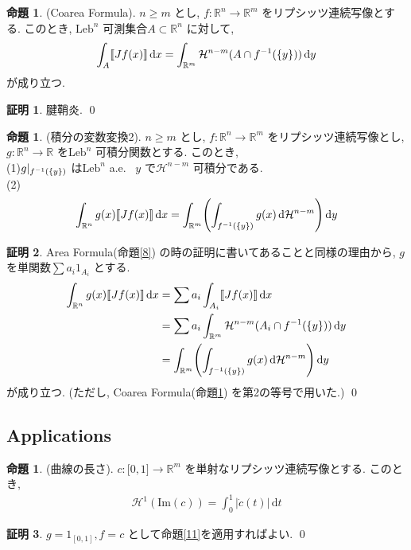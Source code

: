 \documentclass[twocolumn, landscape, a4paper , 8pt, fleqn, titlepage ]{jsarticle}
\theoremstyle{definition}
\newtheorem{prop}[dfn]{命題}
\newtheorem*{pf*}{証明}
\newcommand{\paren}[1]{\mleft( #1\mright )}
\newcommand{\cbra}[1]{\mleft\{#1\mright\}}
\newcommand{\abs}[1]{\left|#1\right|}
\newcommand{\dbra}[1]{\llbracket #1 \rrbracket}
\newcommand{\Leb}{\textrm{Leb}}
\renewcommand{\d}{\, \textrm{d} }
\renewcommand{\-}{\hyphen}
\renewcommand{\Im}{\textrm{Im}}
\begin{document}
\begin{prop}\label{12}(Coarea Formula). 
$n \geq m$ とし, $f: \mathbb R^n \rightarrow \mathbb R^m$ をリプシッツ連続写像とする. このとき, $\Leb ^n $ 可測集合$A \subset \mathbb R^n$ に対して,
\begin{align*} \int_A \dbra{Jf(x) } \d x = \int_{\mathbb R^m} \mathcal H^{n-m} (A \cap f^{-1} (\cbra{y} )) \d y \end{align*}
が成り立つ. 
\end{prop}
\begin{pf*}
腱鞘炎.
\qed
\end{pf*}

\begin{prop}\label{13}(積分の変数変換2).
$n \geq m$ とし, $f: \mathbb R^n \rightarrow \mathbb R^m$ をリプシッツ連続写像とし, $g:\mathbb R^n \rightarrow \mathbb R$ を$\Leb^n$ 可積分関数とする. このとき, \\
(1)$g|_{f^{-1} (\cbra{y})}$ は$\Leb^n$ a.e. \, $y$ で$\mathcal H^{n-m}$ 可積分である. \\
(2)\begin{align*} \int_{\mathbb R^n } g(x) \dbra{Jf(x)} \d x = \int_{\mathbb R^m}\paren{ \int_{f^{-1}(\cbra{y}) } g(x) \d \mathcal H^{n-m}} \d y \end{align*}
\end{prop}
\begin{pf*}
Area Formula(命題\ref{8}) の時の証明に書いてあることと同様の理由から, $g$ を単関数$\sum a_i 1_{A_i}$ とする. 
\begin{align*} \int_{\mathbb R ^n} g(x) \dbra{Jf(x)} \d x &= \sum a_i \int_{A_i} \dbra{Jf(x)} \d x \\&= \sum a_i \int_{\mathbb R^m} \mathcal H^{n-m} (A_i \cap f^{-1} (\cbra{y})) \d y \\ &= \int_{\mathbb R^m}\paren{ \int_{f^{-1}(\cbra{y}) } g(x) \d \mathcal H^{n-m}} \d y  \end{align*}
が成り立つ. (ただし, Coarea Formula(命題\ref{12}) を第2の等号で用いた.)
\qed 
\end{pf*}


\subsection{Applications}

\begin{prop}(曲線の長さ).
$c :\mathbb [0,1] \rightarrow \mathbb R^m$ を単射なリプシッツ連続写像とする. このとき, 
\begin{align*} \mathcal H^1 (\Im(c)) = \int_0^1 \abs{\dot c(t)} \d t \end{align*}
\end{prop}
\begin{pf*}
$g = 1_{[0,1]}, f = c$ として命題\ref{11}を適用すればよい. 
\qed
\end{pf*}
\end{document}
